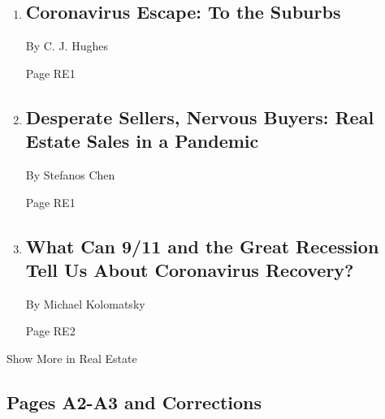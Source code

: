 \begin{enumerate}
\def\labelenumi{\arabic{enumi}.}
\item
  \href{/2020/05/08/realestate/coronavirus-escape-city-to-suburbs.html}{}

  \hypertarget{coronavirus-escape-to-the-suburbs}{%
  \subsection{Coronavirus Escape: To the
  Suburbs}\label{coronavirus-escape-to-the-suburbs}}

  By C. J. Hughes

  Page RE1
\item
  \href{/2020/05/08/realestate/real-estate-sales-coronavirus-pandemic-nervous-buyers-desperate-buyers.html}{}

  \hypertarget{desperate-sellers-nervous-buyers-real-estate-sales-in-a-pandemic}{%
  \subsection{Desperate Sellers, Nervous Buyers: Real Estate Sales in a
  Pandemic}\label{desperate-sellers-nervous-buyers-real-estate-sales-in-a-pandemic}}

  By Stefanos Chen

  Page RE1
\item
  \href{/2020/05/07/realestate/what-can-9-11-and-the-great-recession-tell-us-about-coronavirus-recovery.html}{}

  \hypertarget{what-can-911-and-the-great-recession-tell-us-about-coronavirus-recovery}{%
  \subsection{What Can 9/11 and the Great Recession Tell Us About
  Coronavirus
  Recovery?}\label{what-can-911-and-the-great-recession-tell-us-about-coronavirus-recovery}}

  By Michael Kolomatsky

  Page RE2
\end{enumerate}

Show More in Real Estate

\hypertarget{pages-a2-a3-and-corrections}{%
\subsection{Pages A2-A3 and
Corrections}\label{pages-a2-a3-and-corrections}}

